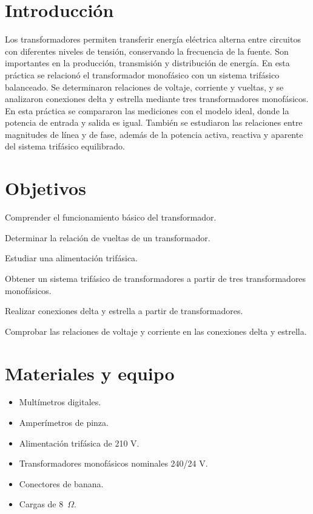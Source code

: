 \documentclass[12pt,a4paper]{article}
\begin{document}
\section{Introducción}
Los transformadores permiten transferir energía eléctrica alterna entre circuitos con diferentes niveles de tensión, conservando la frecuencia de la fuente. Son importantes en la producción, transmisión y distribución de energía. En esta práctica se relacionó el transformador monofásico con un sistema trifásico balanceado. Se determinaron relaciones de voltaje, corriente y vueltas, y se analizaron conexiones delta y estrella mediante tres transformadores monofásicos. En esta práctica se compararon las mediciones con el modelo ideal, donde la potencia de entrada y salida es igual. También se estudiaron las relaciones entre magnitudes de línea y de fase, además de la potencia activa, reactiva y aparente del sistema trifásico equilibrado.
\section{Objetivos}
\begin{itemsinforme}
\item Comprender el funcionamiento básico del transformador.
\item Determinar la relación de vueltas de un transformador.
\item Estudiar una alimentación trifásica.
\item Obtener un sistema trifásico de transformadores a partir de tres transformadores monofásicos.
\item Realizar conexiones delta y estrella a partir de transformadores.
\item Comprobar las relaciones de voltaje y corriente en las conexiones delta y estrella.
\end{itemsinforme}
\section{Materiales y equipo}
\begin{itemize}
\item Multímetros digitales. 
\item Amperímetros de pinza. 
\item Alimentación trifásica de 210 V.
\item Transformadores monofásicos nominales 240/24 V. 
\item Conectores de banana. 
\item Cargas de 8~$\Omega$.
\end{itemize}
\end{document}
